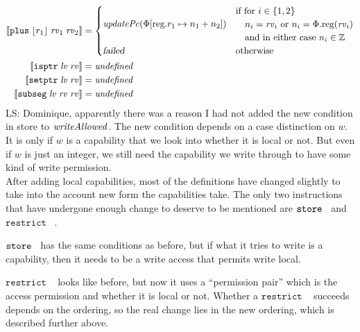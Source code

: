 \documentclass{article}
\newcommand{\update}[2]{[#1 \mapsto #2]}
\newcommand{\sem}[1]{\left\llbracket #1 \right\rrbracket}
\newcommand{\undefined}{\mathit{undefined}}
\newcommand\lau[1]{{\color{purple} \sf \footnotesize {LS: #1}}\\}
\newcommand{\var}[1]{\mathit{#1}}
\newcommand{\rv}{\var{rv}}
\newcommand{\lv}{\var{lv}}
\newcommand{\plainproj}[1]{\mathrm{#1}}
\newcommand{\memreg}[1][\Phi]{#1.\plainproj{reg}}
\newcommand{\updateReg}[3][\Phi]{#1\update{\plainproj{reg}.#2}{#3}}
\newcommand{\failed}{\textsl{failed}}
\newcommand{\plainfun}[2]{
  \ifthenelse{\equal{#2}{}}
             {\mathit{#1}}
             {\mathit{#1}(#2)}
}
\newcommand{\writeAllowed}[1]{\plainfun{writeAllowed}{#1}}
\newcommand{\stdUpdatePc}[1]{\plainfun{updatePc}{#1}}
\newcommand{\ints}{\mathbb{Z}}
\newcommand{\refreg}[1]{\lfloor #1 \rfloor}
\newcommand{\zinstr}[1]{\mathtt{#1}}
\newcommand{\twoinstr}[3]{\zinstr{#1} \; #2 \; #3}
\newcommand{\isptr}[2]{\twoinstr{isptr}{#1}{#2}}
\newcommand{\setptr}[2]{\twoinstr{setptr}{#1}{#2}}
\newcommand{\store}[2]{\twoinstr{store}{#1}{#2}}
\newcommand{\threeinstr}[4]{\zinstr{#1} \; #2 \; #3 \; #4}
\newcommand{\restrict}[3]{\threeinstr{restrict}{#1}{#2}{#3}}
\newcommand{\subseg}[3]{\threeinstr{subseg}{#1}{#2}{#3}}
\newcommand{\plus}[3]{\threeinstr{plus}{#1}{#2}{#3}}
\begin{document}
\begin{align*}
  \sem{\plus{\refreg{r_1}}{\rv_1}{\rv_2}}               & =
                                                          \begin{cases}
                                                            \stdUpdatePc{\updateReg{r_1}{n_1+n_2}} &
                                                            \arraycolsep=0pt
                                                            \begin{array}{l}
                                                              \text{if for $i \in \{1,2\}$}\\
                                                              \quad\text{$n_i = \rv_i$ or $n_i = \memreg(\rv_i)$}\\
                                                              \quad\text{and in either case $n_i \in \ints$}
                                                            \end{array}\\
                                                            \failed & \text{otherwise}
                                                          \end{cases}\\
  \sem{\isptr{\lv}{\rv}} & = \undefined \\ 
  \sem{\setptr{\lv}{\rv}} & = \undefined \\ 
  \sem{\subseg{\lv}{\rv}{\rv}} & = \undefined 
\end{align*}
\lau{Dominique, apparently there was a reason I had not added the new condition in store to $\writeAllowed{}$. The new condition depends on a case distinction on $w$. It is only if $w$ is a capability that we look into whether it is local or not. But even if $w$ is just an integer, we still need the capability we write through to have some kind of write permission.}

After adding local capabilities, most of the definitions have changed slightly to take into the account new form the capabilities take. The only two instructions that have undergone enough change to deserve to be mentioned are $\store{}$ and $\restrict{}{}{}$. 

$\store{}$ has the same conditions as before, but if what it tries to write is a capability, then it needs to be a write access that permits write local.

$\restrict{}{}{}$ looks like before, but now it uses a ``permission pair'' which is the access permission and whether it is local or not. Whether a $\restrict{}{}{}$ succeeds depends on the ordering, so the real change lies in the new ordering, which is described further above.
\end{document}
